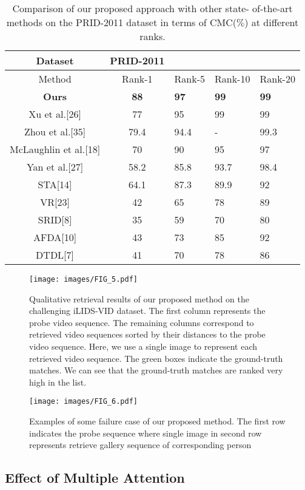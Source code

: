 \documentclass[sigconf, authordraft,review=false]{acmart}
\begin{document}
\begin{table}[h]
\begin{tabular}{cclll}
  \bottomrule
\end{tabular}
\end{table}\begin{table}[h]
  \caption{Comparison of our proposed approach with other state-
of-the-art methods on the PRID-2011 dataset in terms of CMC(\(\%\))
at different ranks.}
  \label{tab:freq}
  \begin{tabular}{cclll}
    \toprule
    Dataset&PRID-2011\\
    \midrule
    Method & Rank-1& Rank-5& Rank-10& Rank-20\\
   \textbf{ Ours} & \textbf{88}& \textbf{97}& \textbf{99}& \textbf{99}\\
    Xu et al.[26] & 77& 95& 99& 99\\
    Zhou et al.[35] & 79.4& 94.4& -& 99.3\\
    McLaughlin et al.[18] &70&90& 95& 97\\
    Yan et al.[27] & 58.2& 85.8& 93.7& 98.4\\
    STA[14] & 64.1&87.3&89.9 & 92\\
    VR[23] &42& 65&78&89\\
    SRID[8]& 35& 59& 70& 80\\
    AFDA[10] &43& 73&85& 92\\
    DTDL[7] & 41&70& 78& 86\\
    
  \bottomrule
\end{tabular}
\end{table}\begin{figure*}
\texttt{[image: images/FIG\_5.pdf]}
\caption{Qualitative retrieval results of our proposed method on the challenging iLIDS-VID dataset. The first column represents the probe
video sequence.  The remaining columns correspond to retrieved video sequences sorted by their distances to the probe video sequence.
Here, we use a single image to represent each retrieved video sequence.  The green boxes indicate the ground-truth matches.  We can see
that the ground-truth matches are ranked very high in the list.}
\end{figure*}\begin{figure*}
\texttt{[image: images/FIG\_6.pdf]}
\caption{Examples of some failure case of our proposed method. The first row indicates the probe sequence where single image in second
row represents retrieve gallery sequence of corresponding person}
\end{figure*}\subsection{ Effect of Multiple Attention}
\end{document}
